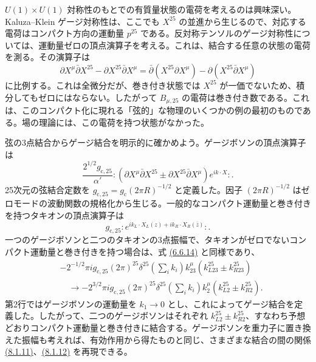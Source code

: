 $U(1)\times U(1)$ 対称性のもとでの有質量状態の電荷を考えるのは興味深い。Kaluza--Klein ゲージ対称性は、ここでも $X^{25}$ の並進から生じるので、対応する電荷はコンパクト方向の運動量 $p^{25}$ である。反対称テンソルのゲージ対称性については、運動量ゼロの頂点演算子を考える。これは、結合する任意の状態の電荷を測る。その演算子は
\begin{equation}
\partial X^\mu\bar\partial X^{25}-\partial X^{25}\bar\partial X^\mu
=\bar\partial(X^{25}\partial X^\mu)-\partial(X^{25}\bar\partial X^\mu)
\tag{8.3.4}\label{eq:8.3.4}
\end{equation}
に比例する。これは全微分だが、巻き付き状態では $X^{25}$ が一価でないため、積分してもゼロにはならない。したがって $B_{\mu,25}$ の電荷は巻き付き数である。これは、このコンパクト化に現れる「弦的」な物理のいくつかの例の最初のものである。場の理論には、この電荷を持つ状態がなかった。

弦の3点結合からゲージ結合を明示的に確かめよう。ゲージボソンの頂点演算子は
\begin{equation}
\frac{2^{1/2}g_{\mathrm c,25}}{\alpha'}:
(\partial X^\mu\bar\partial X^{25}\pm\partial X^{25}\bar\partial X^\mu)e^{ik\cdot X}:.
\tag{8.3.5}\label{eq:8.3.5}
\end{equation}
25次元の弦結合定数を $g_{\mathrm c,25}=g_{\mathrm c}(2\pi R)^{-1/2}$ と定義した。因子 $(2\pi R)^{-1/2}$ はゼロモードの波動関数の規格化から生じる。一般的なコンパクト運動量と巻き付きを持つタキオンの頂点演算子は
\begin{equation}
g_{\mathrm c,25}:e^{ik_L\cdot X_L(z)+ik_R\cdot X_R(\bar z)}:.
\tag{8.3.6}\label{eq:8.3.6}
\end{equation}
一つのゲージボソンと二つのタキオンの3点振幅で、タキオンがゼロでないコンパクト運動量と巻き付きを持つ場合は、式 \hyperref[eq:6.6.14]{(6.6.14)} と同様であり、
\begin{equation}
\begin{aligned}
&-2^{-1/2}\pi ig_{\mathrm c,25}(2\pi)^{25}\delta^{25}\!\left(\sum_i k_i\right)
k_{23}^\mu(k_{L23}^{25}\pm k_{R23}^{25})\\
&\quad\longrightarrow-2^{3/2}\pi ig_{\mathrm c,25}(2\pi)^{25}\delta^{25}\!\left(\sum_i k_i\right)
k_2^\mu(k_{L2}^{25}\pm k_{R2}^{25}).
\end{aligned}
\tag{8.3.7}\label{eq:8.3.7}
\end{equation}
第2行ではゲージボソンの運動量を $k_1\to0$ とし、これによってゲージ結合を定義した。したがって、二つのゲージボソンはそれぞれ $k_{L2}^{25}\pm k_{R2}^{25}$、すなわち予想どおりコンパクト運動量と巻き付きに結合する。ゲージボソンを重力子に置き換えた振幅も考えれば、有効作用から得たものと同じ、さまざまな結合の間の関係 \hyperref[eq:8.1.11]{(8.1.11)}、\hyperref[eq:8.1.12]{(8.1.12)} を再現できる。

